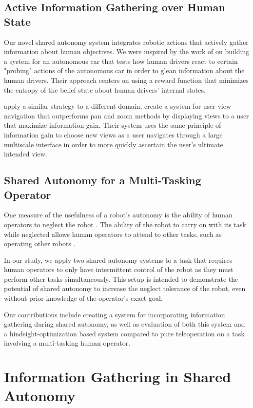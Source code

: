 \documentclass[conference]{IEEEtran}
\begin{document}
\subsection{Active Information Gathering over Human State}
Our novel shared autonomy system integrates robotic actions that actively gather information about human objectives. We were inspired by the work of \citet{sadigh2016information} on building a system for an autonomous car that tests how human drivers react to certain "probing" actions of the autonomous car in order to glean information about the human drivers. Their approach centers on using a reward function that minimizes the entropy of the belief state about human drivers' internal states.

\citet{liu2017bignav} apply a similar strategy to a different domain, create a system for user view navigation that outperforms pan and zoom methods by displaying views to a user that maximize information gain. Their system uses the same principle of information gain to choose new views as a user navigates through a large multiscale interface in order to more quickly ascertain the user's ultimate intended view.

\subsection{Shared Autonomy for a Multi-Tasking Operator}
One measure of the usefulness of a robot's autonomy is the ability of human operators to neglect the robot \cite{crandall2002characterizing, olsen2003metrics}. The ability of the robot to carry on with its task while neglected allows human operators to attend to other tasks, such as operating other robots \cite{crandall2005validating, cummings2008predicting}.

In our study, we apply two shared autonomy systems to a task that requires human operators to only have intermittent control of the robot as they must perform other tasks simultaneously. This setup is intended to demonstrate the potential of shared autonomy to increase the neglect tolerance of the robot, even without prior knowledge of the operator's exact goal.

Our contributions include creating a system for incorporating information gathering during shared autonomy, as well as evaluation of both this system and a hindsight-optimization based system compared to pure teleoperation on a task involving a multi-tasking human operator.

\section{Information Gathering in Shared Autonomy}
\end{document}
